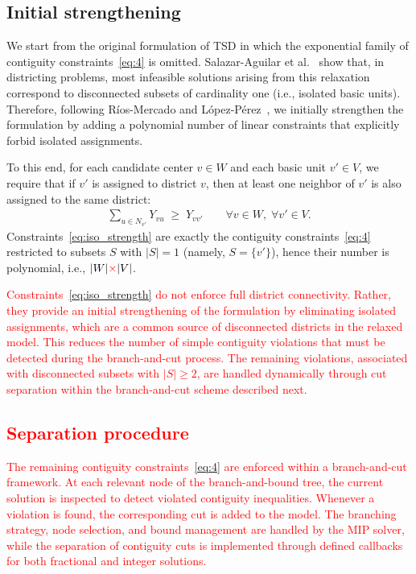 \documentclass[preprint,11pt]{elsarticle}
\begin{document}
\subsection{Initial strengthening} \label{subsec:initial_strengthening}

We start from the original formulation of TSD in which the exponential family of contiguity constraints~\eqref{eq:4} is omitted.
Salazar-Aguilar et al.~\citep{Salazar2011} show that, in districting problems, most infeasible solutions arising from this relaxation correspond to disconnected subsets of cardinality one (i.e., isolated basic units).
Therefore, following R\'ios-Mercado and L\'opez-P\'erez~\citep{Rios2013}, we initially strengthen the formulation by adding a polynomial number of linear constraints that explicitly forbid isolated assignments.

To this end, for each candidate center $v \in W$ and each basic unit $v' \in V$, we require that if $v'$ is assigned to district $v$, then at least one neighbor of $v'$ is also assigned to the same district:
\begin{align}
\sum_{u \in N_{v'}} Y_{vu} \;\ge\; Y_{vv'}
\qquad \forall v \in W,\; \forall v' \in V .
\label{eq:iso_strength}
\end{align}
Constraints~\eqref{eq:iso_strength} are exactly the contiguity constraints~\eqref{eq:4} restricted to subsets $S$ with $|S|=1$ (namely, $S=\{v'\}$), hence their number is polynomial, i.e., $|W|\textcolor{red}{\times}|V|$.

\textcolor{red}{
Constraints~\eqref{eq:iso_strength} do not enforce full district connectivity. 
Rather, they provide an initial strengthening of the formulation by eliminating isolated assignments, which are a common source of disconnected districts in the relaxed model. 
This reduces the number of simple contiguity violations that must be detected during the branch-and-cut process. 
The remaining violations, associated with disconnected subsets with $|S|\ge 2$, are handled dynamically through cut separation within the branch-and-cut scheme described next.
}



\subsection{\textcolor{red}{Separation procedure}}
\label{subsec:separation}
\textcolor{red}{
The remaining contiguity constraints~\eqref{eq:4} are enforced within a branch-and-cut framework. 
At each relevant node of the branch-and-bound tree, the current solution is inspected to detect violated contiguity inequalities. 
Whenever a violation is found, the corresponding cut is added to the model. 
The branching strategy, node selection, and bound management are handled by the MIP solver, while the separation of contiguity cuts is implemented through defined callbacks for both fractional and integer solutions.}
\end{document}
